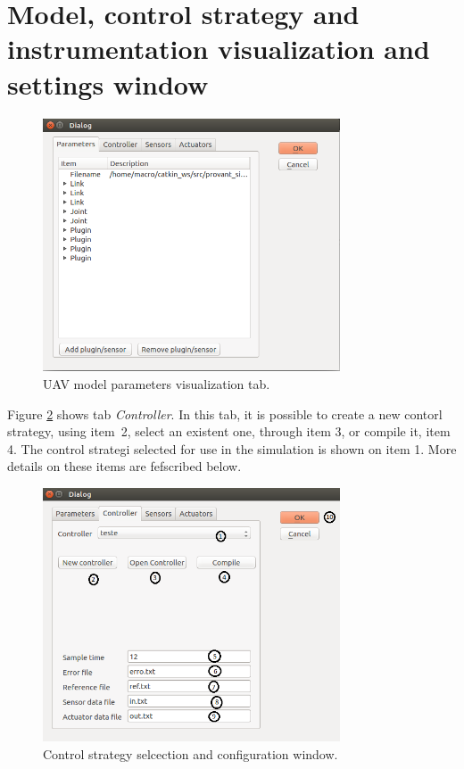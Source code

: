 \section{Model, control strategy and instrumentation visualization and settings window}
\label{SecEstCtrl}

\begin{figure}[!ht]
	\centering
	\includegraphics[width=250pt]{figuras/4.png}
	\caption{UAV model parameters visualization tab.}
	\label{4}
\end{figure}

Figure \ref{5} shows tab \textit{Controller}. In this tab, it is possible to create a new contorl strategy, using item~2, select an existent one, through item 3, or compile it, item 4. The control strategi selected for use in the simulation is shown on item 1. More details on these items are fefscribed below.

\begin{figure}[!ht]
	\centering
	\includegraphics[width=250pt]{figuras/5_2.png}
	\caption{Control strategy selcection and configuration window.}
	\label{5}
\end{figure}


